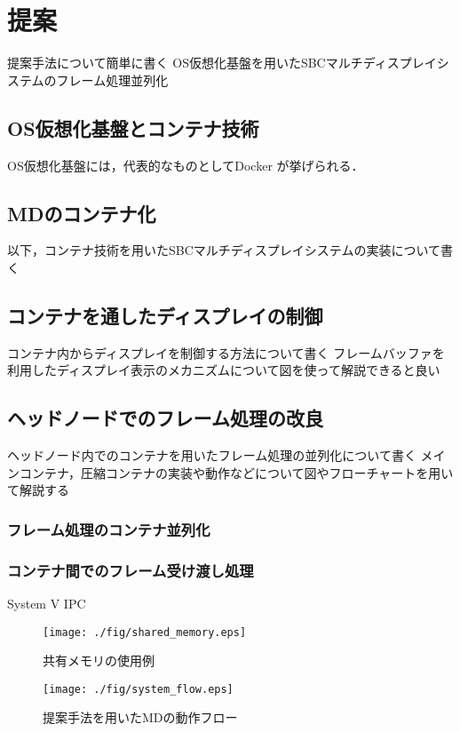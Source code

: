 \chapter{提案}
提案手法について簡単に書く
OS仮想化基盤を用いたSBCマルチディスプレイシステムのフレーム処理並列化

\section{OS仮想化基盤とコンテナ技術}
OS仮想化基盤には，代表的なものとしてDocker \cite{docker}が挙げられる．


\section{MDのコンテナ化}
以下，コンテナ技術を用いたSBCマルチディスプレイシステムの実装について書く

\section{コンテナを通したディスプレイの制御}
コンテナ内からディスプレイを制御する方法について書く
フレームバッファを利用したディスプレイ表示のメカニズムについて図を使って解説できると良い


\section{ヘッドノードでのフレーム処理の改良}
ヘッドノード内でのコンテナを用いたフレーム処理の並列化について書く
メインコンテナ，圧縮コンテナの実装や動作などについて図やフローチャートを用いて解説する

\subsection*{フレーム処理のコンテナ並列化}
\subsection*{コンテナ間でのフレーム受け渡し処理}
System V IPC \cite{kerrisk2010linux}
\begin{figure}[H]
    \hspace*{\fill}
    \texttt{[image: ./fig/shared\_memory.eps]}
    \hspace*{\fill}
    \caption{共有メモリの使用例}
   \end{figure}

\begin{figure}[H]
    \hspace*{\fill}
    \texttt{[image: ./fig/system\_flow.eps]}
    \hspace*{\fill}
    \caption{提案手法を用いたMDの動作フロー}
   \end{figure}
